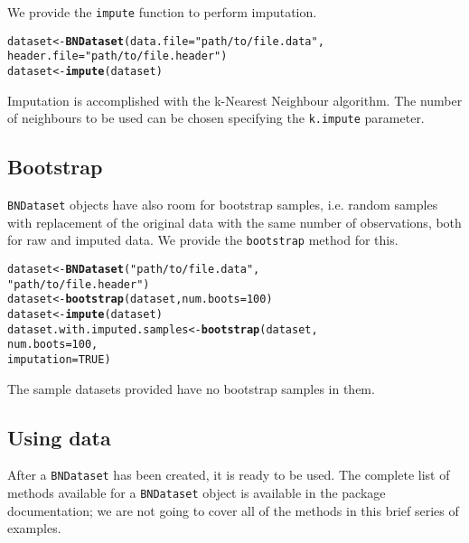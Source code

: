 \documentclass{article}\usepackage[]{graphicx}\usepackage[]{color}
\makeatletter
\newcommand{\hlnum}[1]{\textcolor[rgb]{0.686,0.059,0.569}{#1}}%
\newcommand{\hlstr}[1]{\textcolor[rgb]{0.192,0.494,0.8}{#1}}%
\newcommand{\hlstd}[1]{\textcolor[rgb]{0.345,0.345,0.345}{#1}}%
\newcommand{\hlkwb}[1]{\textcolor[rgb]{0.69,0.353,0.396}{#1}}%
\newcommand{\hlkwc}[1]{\textcolor[rgb]{0.333,0.667,0.333}{#1}}%
\newcommand{\hlkwd}[1]{\textcolor[rgb]{0.737,0.353,0.396}{\textbf{#1}}}%
\newenvironment{kframe}{%
 \def\at@end@of@kframe{}%
 \ifinner\ifhmode%
  \def\at@end@of@kframe{\end{minipage}}%
  \begin{minipage}{\columnwidth}%
 \fi\fi%
 \def\FrameCommand##1{\hskip\@totalleftmargin \hskip-\fboxsep
 \colorbox{shadecolor}{##1}\hskip-\fboxsep
     \hskip-\linewidth \hskip-\@totalleftmargin \hskip\columnwidth}%
 \MakeFramed {\advance\hsize-\width
   \@totalleftmargin\z@ \linewidth\hsize
   \@setminipage}}%
 {\par\unskip\endMakeFramed%
 \at@end@of@kframe}
\newenvironment{knitrout}{}{} %
\newcommand{\Robject}[1]{{\texttt{#1}}}
\newcommand{\Rmethod}[1]{{\texttt{#1}}}
\newcommand{\Rfunarg}[1]{{\texttt{#1}}}
\makeatother
\begin{document}
We provide the \Rmethod{impute} function to perform imputation.
\begin{knitrout}
\color{fgcolor}\begin{kframe}
\begin{alltt}
\hlstd{dataset} \hlkwb{<-} \hlkwd{BNDataset}\hlstd{(}\hlkwc{data.file}   \hlstd{=} \hlstr{"path/to/file.data"}\hlstd{,}
                     \hlkwc{header.file} \hlstd{=} \hlstr{"path/to/file.header"}\hlstd{)}
\hlstd{dataset} \hlkwb{<-} \hlkwd{impute}\hlstd{(dataset)}
\end{alltt}
\end{kframe}
\end{knitrout}

Imputation is accomplished with the k-Nearest Neighbour algorithm. The number of neighbours to be used
can be chosen specifying the \Rfunarg{k.impute} parameter.


\subsection{Bootstrap}
\Robject{BNDataset} objects have also room for bootstrap samples, i.e. random samples with replacement of the original data with the same number of observations, both for raw and imputed data.
We provide the \Rmethod{bootstrap} method for this.
\begin{knitrout}
\color{fgcolor}\begin{kframe}
\begin{alltt}
\hlstd{dataset} \hlkwb{<-} \hlkwd{BNDataset}\hlstd{(}\hlstr{"path/to/file.data"}\hlstd{,}
                     \hlstr{"path/to/file.header"}\hlstd{)}
\hlstd{dataset} \hlkwb{<-} \hlkwd{bootstrap}\hlstd{(dataset,} \hlkwc{num.boots} \hlstd{=} \hlnum{100}\hlstd{)}
\hlstd{dataset} \hlkwb{<-} \hlkwd{impute}\hlstd{(dataset)}
\hlstd{dataset.with.imputed.samples} \hlkwb{<-} \hlkwd{bootstrap}\hlstd{(dataset,}
                                          \hlkwc{num.boots} \hlstd{=} \hlnum{100}\hlstd{,}
                                          \hlkwc{imputation} \hlstd{=} \hlnum{TRUE}\hlstd{)}
\end{alltt}
\end{kframe}
\end{knitrout}

The sample datasets provided have no bootstrap samples in them.


\subsection{Using data}
\label{sec:usingdata}
After a \Robject{BNDataset} has been created, it is ready to be used.
The complete list of methods available for a \Robject{BNDataset} object is available
in the package documentation; we are not going to cover all of the methods in this brief series
of examples.
\end{document}
